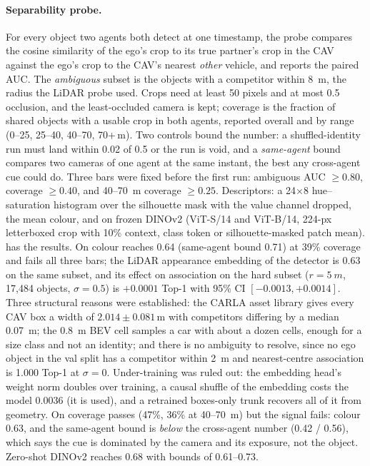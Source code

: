 \paragraph{Separability probe.}
For every object two agents both detect at one timestamp, the probe compares the cosine similarity of the ego's crop to its true partner's crop in the CAV against the ego's crop to the CAV's nearest \emph{other} vehicle, and reports the paired AUC. The \emph{ambiguous} subset is the objects with a competitor within \SI{8}{m}, the radius the LiDAR probe used. Crops need at least 50 pixels and at most 0.5 occlusion, and the least-occluded camera is kept; coverage is the fraction of shared objects with a usable crop in both agents, reported overall and by range (0--25, 25--40, 40--70, 70+\,m). Two controls bound the number: a shuffled-identity run must land within 0.02 of 0.5 or the run is void, and a \emph{same-agent} bound compares two cameras of one agent at the same instant, the best any cross-agent cue could do. Three bars were fixed before the first run: ambiguous AUC $\ge 0.80$, coverage $\ge 0.40$, and 40--\SI{70}{m} coverage $\ge 0.25$. Descriptors: a 24$\times$8 hue--saturation histogram over the silhouette mask with the value channel dropped, the mean colour, and on \vxreal frozen DINOv2 (ViT-S/14 and ViT-B/14, 224-px letterboxed crop with 10\% context, class token or silhouette-masked patch mean).  has the results. On \opvv colour reaches 0.64 (same-agent bound 0.71) at 39\% coverage and fails all three bars; the LiDAR appearance embedding of the detector is 0.63 on the same subset, and its effect on association on the hard subset ($r{=}\SI{5}{m}$, 17,484 objects, $\sigma{=}0.5$) is $+0.0001$ Top-1 with 95\% CI $[-0.0013, +0.0014]$. Three structural reasons were established: the CARLA asset library gives every CAV box a width of $2.014\pm0.081$\,m with competitors differing by a median \SI{0.07}{m}; the \SI{0.8}{m} BEV cell samples a car with about a dozen cells, enough for a size class and not an identity; and there is no ambiguity to resolve, since no ego object in the val split has a competitor within \SI{2}{m} and nearest-centre association is 1.000 Top-1 at $\sigma{=}0$. Under-training was ruled out: the embedding head's weight norm doubles over training, a causal shuffle of the embedding costs the model 0.0036 (it is used), and a retrained boxes-only trunk recovers all of it from geometry. On \vxreal coverage passes (47\%, 36\% at 40--\SI{70}{m}) but the signal fails: colour 0.63, and the same-agent bound is \emph{below} the cross-agent number (0.42 / 0.56), which says the cue is dominated by the camera and its exposure, not the object. Zero-shot DINOv2 reaches 0.68 with bounds of 0.61--0.73.

